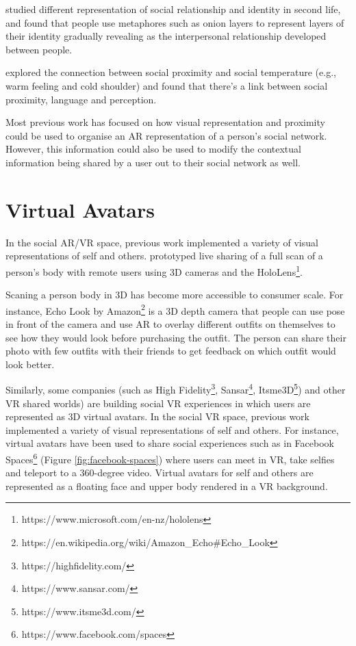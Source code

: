 \textcite{Leshed2012} studied different representation of social relationship and identity in second life, and found that people use metaphores such as onion layers to represent layers of their identity gradually revealing as the interpersonal relationship developed between people. 

\textcite{Hans2009} explored the connection between social proximity and social temperature (e.g., warm feeling and cold shoulder) and found that there’s a link between social proximity, language and perception. 


\cite{Gergle2004}


Most previous work has focused on how visual representation and proximity could be used to organise an AR representation of a person's social network. However, this information could also be used to modify the contextual information being shared by a user out to their social network as well. 

\section{Virtual Avatars}

In the social AR/VR space, previous work implemented a variety of visual representations of self and others. \textcite{Fanello2016} prototyped live sharing of a full scan of a person's body with remote users using 3D cameras and the HoloLens\footnote{https://www.microsoft.com/en-nz/hololens}. 

Scaning a person body in 3D has become more accessible to consumer scale. For instance, Echo Look by Amazon\footnote{https://en.wikipedia.org/wiki/Amazon_Echo#Echo_Look} is a 3D depth camera that people can use pose in front of the camera and use AR to overlay different outfits on themselves to see how they would look before purchasing the outfit. The person can share their photo with few outfits with their friends to get feedback on which outfit would look better. 

Similarly, some companies (such as High Fidelity\footnote{https://highfidelity.com/}, Sansar\footnote{https://www.sansar.com/}, Itsme3D\footnote{https://www.itsme3d.com/}) and other VR shared worlds) are building social VR experiences in which users are represented as 3D virtual avatars. In the social VR space, previous work implemented a variety of visual representations of self and others. For instance, virtual avatars have been used to share social experiences such as in Facebook Spaces\footnote{https://www.facebook.com/spaces} (Figure \ref{fig:facebook-spaces}) where users can meet in VR, take selfies and teleport to a 360-degree video. Virtual avatars for self and others are represented as a floating face and upper body rendered in a VR background. 

